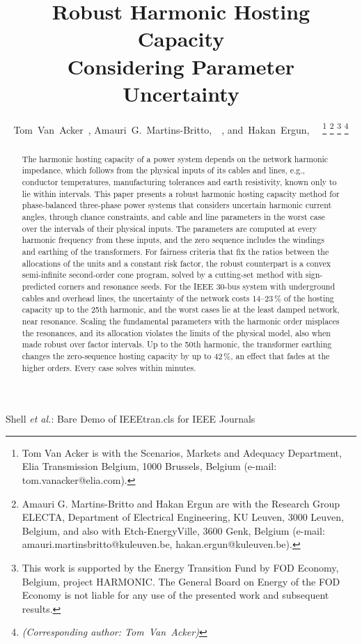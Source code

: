 \documentclass[journal]{IEEEtran}
\begin{document}
\title{Robust Harmonic Hosting Capacity \\ Considering Parameter Uncertainty}
\author{Tom~Van~Acker~, %
        Amauri~G.~Martins-Britto,~~, %
        and~Hakan~Ergun,~~%
\thanks{Tom Van Acker is with the Scenarios, Markets and Adequacy Department, Elia Transmission Belgium, 1000 Brussels, Belgium (e-mail: tom.vanacker@elia.com).}%
\thanks{Amauri G. Martins-Britto and Hakan Ergun are with the Research Group ELECTA, Department of Electrical Engineering, KU Leuven, 3000 Leuven, Belgium, and also with Etch-EnergyVille, 3600 Genk, Belgium (e-mail: amauri.martinsbritto@kuleuven.be, hakan.ergun@kuleuven.be).}
\thanks{This work is supported by the Energy Transition Fund by FOD Economy, Belgium, project HARMONIC. The General Board on Energy of the FOD Economy is not liable for any use of the presented work and subsequent results.}
\thanks{\textit{(Corresponding author: Tom~Van~Acker)}}}

%
{Shell \MakeLowercase{\textit{et al.}}: Bare Demo of IEEEtran.cls for IEEE Journals}

\maketitle

\begin{abstract}
The harmonic hosting capacity of a power system depends on the network harmonic impedance, which follows from the physical inputs of its cables and lines, e.g., conductor temperatures, manufacturing tolerances and earth resistivity, known only to lie within intervals. This paper presents a robust harmonic hosting capacity method for phase-balanced three-phase power systems that considers uncertain harmonic current angles, through chance constraints, and cable and line parameters in the worst case over the intervals of their physical inputs. The parameters are computed at every harmonic frequency from these inputs, and the zero sequence includes the windings and earthing of the transformers. For fairness criteria that fix the ratios between the allocations of the units and a constant risk factor, the robust counterpart is a convex semi-infinite second-order cone program, solved by a cutting-set method with sign-predicted corners and resonance seeds. For the IEEE 30-bus system with underground cables and overhead lines, the uncertainty of the network costs 14--23\,\% of the hosting capacity up to the 25th harmonic, and the worst cases lie at the least damped network, near resonance. Scaling the fundamental parameters with the harmonic order misplaces the resonances, and its allocation violates the limits of the physical model, also when made robust over factor intervals. Up to the 50th harmonic, the transformer earthing changes the zero-sequence hosting capacity by up to 42\,\%, an effect that fades at the higher orders. Every case solves within minutes.
\end{abstract}
\end{document}
